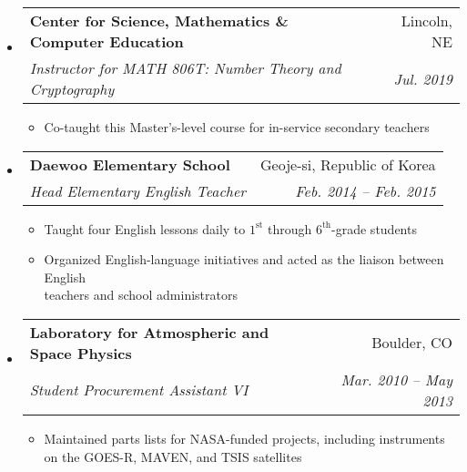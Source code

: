 \documentclass[letterpaper,11pt]{article}
\makeatletter
\newcommand{\resitem}[1]{\item #1 \vspace{-2pt}}
\newcommand{\ressubheading}[4]{
\begin{tabular*}{6.5in}{l@{\extracolsep{\fill}}r}
		\textbf{#1} & #2 \\
		\textit{#3} & \textit{#4} \\
\end{tabular*}\vspace{-6pt}}
\makeatother
\begin{document}
\begin{itemize}
        \item
			\ressubheading{Center for Science, Mathematics \& Computer Education}{Lincoln, NE}{Instructor for MATH 806T: Number Theory and Cryptography}{Jul. 2019}
				{\footnotesize
				\begin{itemize}
				    \resitem{Co-taught this Master's-level course for in-service secondary teachers}
				\end{itemize}
				}
		\item 
		\begin{samepage}
			\ressubheading{Daewoo Elementary School}{Geoje-si, Republic of Korea}{Head Elementary English Teacher}{Feb. 2014 -- Feb. 2015}
				{\footnotesize
				\begin{itemize}
				    \resitem{Taught four English lessons daily to $1^{\text{st}}$ through $6^{\text{th}}$-grade students}
				    \resitem{Organized English-language initiatives and acted as the liaison between  English \\ teachers and school administrators}
				\end{itemize}
				}
		\end{samepage}
        		\item
			\ressubheading{Laboratory for Atmospheric and Space Physics}{Boulder, CO}{Student Procurement Assistant VI}{Mar. 2010 -- May 2013}
				{\footnotesize
				\begin{itemize}
				    \resitem{Maintained parts lists for NASA-funded projects, including instruments \\on the GOES-R, MAVEN, and TSIS satellites}

\end{itemize}}
\end{itemize}
\end{document}
